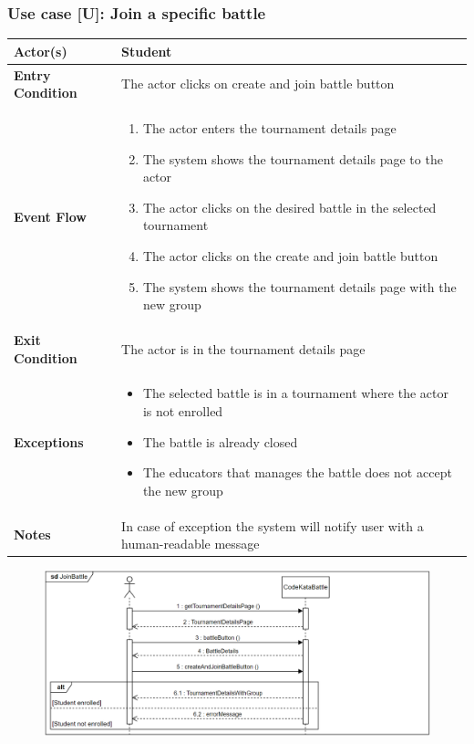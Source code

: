 \documentclass[12pt, a4paper]{report}
\newcounter{useCase}
\newcommand{\usecase}[9]{
    \def\arraystretch{1.5} 
    \subsubsection*{Use case [U#2]: #3}
    \vspace*{0.2cm}
    \begin{center}
        \begin{tabular}{|l|p{12cm}|}
            \hline
            \textbf{Actor(s)} & #4 \\
            \hline
            \textbf{Entry Condition} & #5 \\
            \hline
            \textbf{Event Flow} & #6 \\
            \hline
            \textbf{Exit Condition} & #7 \\
            \hline
            \textbf{Exceptions} & #8 \\
            \hline
            \textbf{Notes} & #9 \\
            \hline
        \end{tabular}
    \end{center}
    #1
}
\begin{document}
        \usecase{\begin{figure}[H]\centering\includegraphics[width=0.9\linewidth]{images/joinbattle.png}\end{figure}}        
        {\arabic{useCase}\stepcounter{useCase}}
        {Join a specific battle}
        {Student}
        {The actor clicks on create and join battle button}
        {
        \begin{enumerate}
            \item The actor enters the tournament details page
            \item The system shows the tournament details page to the actor
            \item The actor clicks on the desired battle in the selected tournament
            \item The actor clicks on the create and join battle button
            \item The system shows the tournament details page with the new group
        \end{enumerate}
        }
        {The actor is in the tournament details page}
        {
        \begin{itemize}
            \item The selected battle is in a tournament where the actor is not enrolled
            \item The battle is already closed
            \item The educators that manages the battle does not accept the new group
        \end{itemize}
        }
        {In case of exception the system will notify user with a human-readable message}
\end{document}
